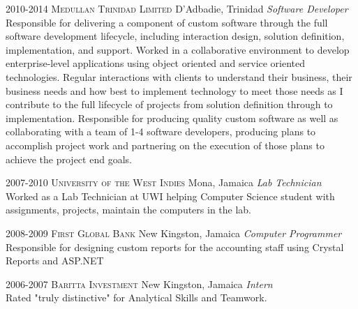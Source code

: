 \documentclass[]{friggeri-cv} %
\begin{document}
\begin{entrylist}
\entry
{2010-2014}
{\textsc{Medullan Trinidad Limited}}
{D'Adbadie, Trinidad}
{\emph{Software Developer} \\
Responsible for delivering a component of custom software through the full software development
lifecycle, including interaction design, solution definition, implementation, and support.
Worked in a collaborative environment to develop enterprise-level applications
using object oriented and service oriented technologies. Regular interactions with clients to understand
their business, their business needs and how best to implement technology to meet
those needs as I contribute to the full lifecycle of projects from solution definition through
to implementation. Responsible for producing quality custom software as well as collaborating
with a team of 1-4 software developers, producing plans to accomplish project work and partnering on
the execution of those plans to achieve the project end goals.}
\end{entrylist}

\begin{entrylist}
\entry
{2007-2010}
{\textsc{University of the West Indies}}
{Mona, Jamaica}
{\emph{Lab Technician} \\
Worked as a Lab Technician at UWI helping Computer Science student with assignments, 
projects, maintain the computers in the lab.}
\end{entrylist}

\begin{entrylist}
\entry
{2008-2009}
{\textsc{First Global Bank}}
{New Kingston, Jamaica}
{\emph{Computer Programmer} \\
Responsible for designing custom reports for the accounting staff using Crystal Reports and ASP.NET}
\end{entrylist}

\begin{entrylist}
\entry
{2006-2007}
{\textsc{Baritta Investment}}
{New Kingston, Jamaica}
{\emph{Intern} \\
Rated "truly distinctive" for Analytical Skills and Teamwork.}
\end{entrylist}
\end{document}
